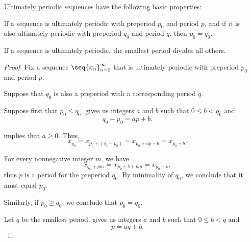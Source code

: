 \begin{proposition}\label{thm:def:ultimately_periodic_sequence}
  \hyperref[def:ultimately_periodic_sequence]{Ultimately periodic sequences} have the following basic properties:
  \begin{thmenum}
     If a sequence is ultimately periodic with preperiod \( p_0 \) and period \( p \), and if it is also ultimately periodic with preperiod \( q_0 \) and period \( q \), then \( p_0 = q_0 \).

     If a sequence is ultimately periodic, the smallest period divides all others.
  \end{thmenum}
\end{proposition}
\begin{proof}
  Fix a sequence \( \seq{ x_n }_{n=0}^\infty \) that is ultimately periodic with preperiod \( p_0 \) and period \( p \).

   Suppose that \( q_0 \) is also a preperiod with a corresponding period \( q \).

  Suppose first that \( p_0 \leq q_0 \).  gives us integers \( a \) and \( b \) such that \( 0 \leq b < q_0 \) and
  \begin{equation*}
    q_0 - p_0 = ap + b.
  \end{equation*}

   implies that \( a \geq 0 \). Thus,
  \begin{equation*}
    x_{q_0} = x_{p_0 + (q_0 - p_0)} = x_{p_0 + ap + b} = x_{p_0 + b}.
  \end{equation*}

  For every nonnegative integer \( m \), we have
  \begin{equation*}
    x_{q_0 + pm} = x_{p_0 + b + pm} = x_{p_0 + b},
  \end{equation*}
  thus \( p \) is a period for the preperiod \( q_0 \). By minimality of \( q_0 \), we conclude that it must equal \( p_0 \).

  Similarly, if \( p_0 \geq q_0 \), we conclude that \( p_0 = q_0 \).

   Let \( q \) be the smallest period.  gives us integers \( a \) and \( b \) such that \( 0 \leq b < q \) and
  \begin{equation*}
    p = aq + b.
  \end{equation*}


\end{proof}

